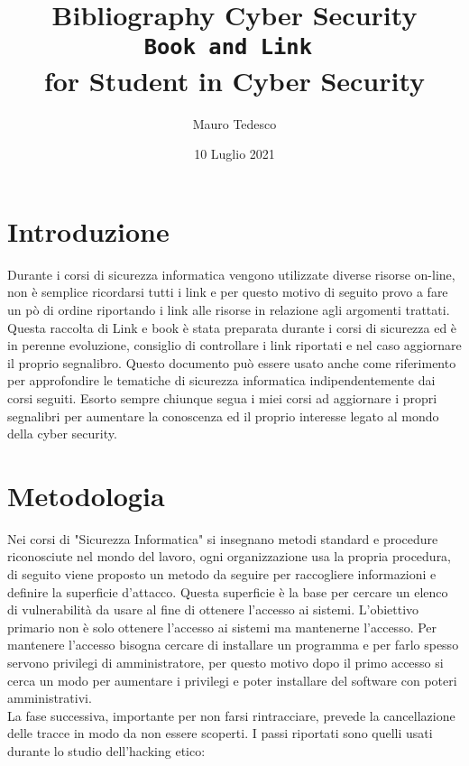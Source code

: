 \documentclass[a4paper,12pt]{article}
\title{Bibliography Cyber Security\\ \texttt{Book and Link } \\ for Student in Cyber Security}
\author{Mauro Tedesco }
\date{10 Luglio 2021}
\begin{document}
\maketitle

\tableofcontents

\section{Introduzione}

Durante i corsi di sicurezza informatica vengono utilizzate diverse risorse on-line, non è semplice ricordarsi tutti i link e per questo motivo di seguito provo a fare un pò di ordine riportando i link alle risorse in relazione agli argomenti trattati.
Questa raccolta di Link e book è stata preparata durante i corsi di sicurezza ed è in perenne evoluzione, consiglio di controllare i link riportati e nel caso aggiornare il proprio segnalibro.
Questo documento può essere usato anche come riferimento per approfondire le tematiche di sicurezza informatica indipendentemente dai corsi seguiti. Esorto sempre chiunque segua i miei corsi ad aggiornare i propri segnalibri per aumentare la conoscenza ed il proprio interesse legato al mondo della cyber security.

\section{Metodologia}

Nei corsi di "Sicurezza Informatica" si insegnano metodi standard e procedure riconosciute nel mondo del lavoro, ogni organizzazione usa la propria procedura, di seguito viene proposto un metodo da seguire per  raccogliere informazioni e definire la superficie d'attacco.
Questa superficie è la base per cercare un elenco di vulnerabilità da usare al fine di ottenere l'accesso ai sistemi. 
L'obiettivo primario non è solo ottenere l'accesso ai sistemi ma mantenerne l'accesso.
Per mantenere l'accesso bisogna cercare di installare un programma e per farlo spesso servono privilegi di amministratore, per questo motivo dopo il primo accesso si cerca  un modo per
aumentare i privilegi e poter installare del software con poteri amministrativi.
\\ La fase successiva, importante per non farsi rintracciare, prevede la cancellazione delle tracce
in modo da non essere scoperti.
I passi riportati sono quelli usati durante lo studio dell'hacking etico:
\end{document}
